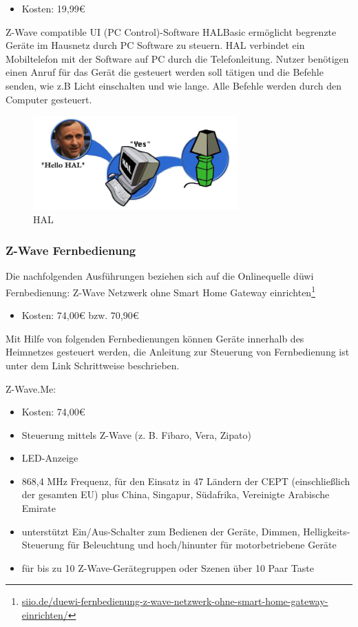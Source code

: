 \begin{itemize}
\item Kosten: 19,99€
\end{itemize}

\noindent
Z-Wave compatible UI (PC Control)-Software HALBasic ermöglicht begrenzte Geräte im Hausnetz
durch PC Software zu steuern. HAL verbindet ein Mobiltelefon mit der Software auf PC durch die Telefonleitung. Nutzer benötigen einen Anruf für das Gerät die gesteuert werden soll tätigen und die Befehle senden, wie z.B Licht einschalten und wie lange. Alle Befehle werden durch den Computer gesteuert.

\begin{figure}[h!]
	\centering
	\includegraphics[width=0.7\textwidth]{img/Feedback-Mechanismen/HAL.png}
	\caption{HAL}
	\label{fig:feedbackHAL}
\end{figure}

\subsubsection{Z-Wave Fernbedienung}
Die nachfolgenden Ausführungen beziehen sich auf die Onlinequelle \glqq düwi Fernbedienung: Z-Wave Netzwerk ohne Smart Home Gateway einrichten\grqq\footnote{\url{siio.de/duewi-fernbedienung-z-wave-netzwerk-ohne-smart-home-gateway-einrichten/}}

\begin{itemize}
\item Kosten: 74,00€ bzw. 70,90€
\end{itemize}

\noindent
Mit Hilfe von folgenden Fernbedienungen können Geräte innerhalb des Heimnetzes gesteuert werden, die Anleitung zur Steuerung von Fernbedienung ist unter dem Link Schrittweise beschrieben.

\noindent
Z-Wave.Me: 

\begin{itemize}
\item Kosten: 74,00€
\item Steuerung mittels Z-Wave (z. B. Fibaro, Vera, Zipato) 
\item LED-Anzeige
\item 868,4 MHz Frequenz, für den Einsatz in 47 Ländern der CEPT (einschließlich der gesamten EU) plus China, Singapur, Südafrika, Vereinigte Arabische Emirate
\item unterstützt Ein/Aus-Schalter zum Bedienen der Geräte, Dimmen, Helligkeits-Steuerung für Beleuchtung und hoch/hinunter für motorbetriebene Geräte
\item für bis zu 10 Z-Wave-Gerätegruppen oder Szenen über 10 Paar Taste
\end{itemize}

